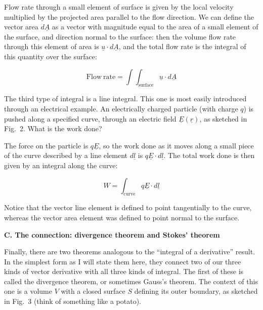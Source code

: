   Flow rate through a small element of surface is given by the local velocity 
  multiplied by the projected area parallel to the flow direction. We can 
  define the vector area $d\underline{A}$ as a vector with magnitude equal to 
  the area of a small element of the surface, and direction normal to the 
  surface: then the volume flow rate through this element of area is 
  $\underline{u} \cdot d\underline{A}$, and the total flow rate is the integral 
  of this quantity over the surface: 

  $$\mathrm{Flow~rate} = \int{\int_{\mathrm{surface}}{\underline{u} \cdot 
  d\underline{A}}} \tag{9}$$ 

  The third type of integral is a line integral. This one is most easily 
  introduced through an electrical example. An electrically charged particle 
  (with charge $q$) is pushed along a specified curve, through an electric 
  field $\underline{E}(\underline{r})$, as sketched in Fig.\ 2. What is the 
  work done? 


  The force on the particle is $q\underline{E}$, so the work done as it moves 
  along a small piece of the curve described by a line element $d\underline{l}$ 
  is $q\underline{E} \cdot d\underline{l}$. The total work done is then given 
  by an integral along the curve: 

  $$W=\int_\mathrm{curve}{q\underline{E} \cdot d\underline{l}} \tag{10}$$ 

  Notice that the vector line element is defined to point tangentially to the 
  curve, whereas the vector area element was defined to point normal to the 
  surface. 

  \textbf{C. The connection: divergence theorem and Stokes' theorem} 

  Finally, there are two theorems analogous to the ``integral of a derivative'' 
  result. In the simplest form as I will state them here, they connect two of 
  our three kinds of vector derivative with all three kinds of integral. The 
  first of these is called the divergence theorem, or sometimes Gauss's 
  theorem. The context of this one is a volume $V$ with a closed surface $S$ 
  defining its outer boundary, as sketched in Fig.\ 3 (think of something like 
  a potato). 


